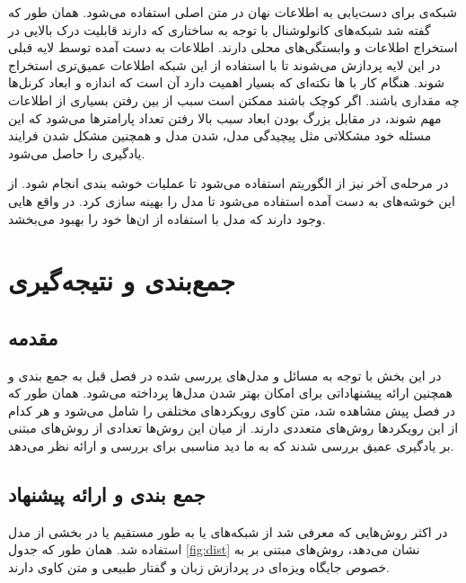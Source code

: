 \documentclass[12pt, a4paper, oneside]{report}
\begin{document}
شبکه‌ی
برای دست‌یابی به اطلاعات نهان در متن اصلی استفاده می‌شود. همان طور که گفته شد شبکه‌های کانولوشنال
با توجه به ساختاری که دارند قابلیت درک بالایی در استخراج اطلاعات و وابستگی‌های محلی دارند. اطلاعات به دست آمده
توسط لایه قبلی در این لایه پردازش می‌شوند تا با استفاده از این شبکه اطلاعات عمیق‌تری استخراج شوند.
هنگام کار با
ها نکته‌ای که بسیار اهمیت دارد آن است که اندازه و ابعاد کرنل‌ها چه مقداری باشند. اگر کوچک باشند ممکتن است
سبب از بین رفتن بسیاری از اطلاعات مهم شوند، در مقابل بزرگ بودن ابعاد سبب بالا رفتن تعداد پارامتر‌ها می‌شود که این
مسئله خود مشکلاتی مثل پیچیدگی مدل،
شدن مدل و همچنین مشکل شدن فرایند یادگیری را حاصل می‌شود.

در مرحله‌ی آخر نیز از الگوریتم
استفاده می‌شود تا عملیات خوشه بندی انجام شود. از این خوشه‌های به دست آمده استفاده می‌شود تا مدل را بهینه سازی کرد.
در واقع
هایی وجود دارند که مدل با استفاده از ان‌ها خود را بهبود می‌بخشد.

\chapter{جمع‌بندی و نتیجه‌گیری}
\pagebreak
\section{مقدمه}

در این بخش با توجه به مسائل و مدل‌های یررسی شده در فصل قبل به جمع بندی و همچنین ارائه پیشنهاداتی برای
امکان بهتر شدن مدل‌ها پرداخته می‌شود. همان طور که در فصل پیش مشاهده شد، متن کاوی رویکردهای مختلفی را
شامل می‌شود و هر کدام از این رویکرد‌ها روش‌های متعددی دارند. از میان این روش‌ها تعدادی از روش‌های مبتنی
بر یادگیری عمیق بررسی شدند که به ما دید مناسبی برای بررسی و ارائه نظر می‌دهد.

\section{جمع بندی و ارائه پیشنهاد}

در اکثر روش‌هایی که معرفی شد از شبکه‌های
یا به طور مستقیم یا در بخشی از مدل استفاده شد. همان طور که جدول
\ref{fig:dist}
نشان می‌دهد، روش‌های مبتنی بر
به خصوص
جایگاه ویزه‌ای در پردازش زبان و گفتار طبیعی و متن کاوی دارند.
\end{document}
